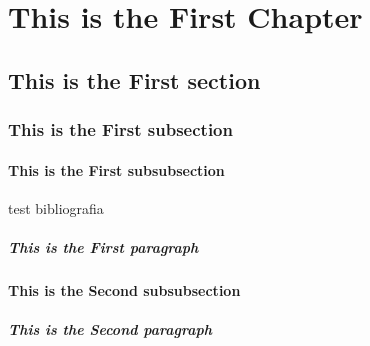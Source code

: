 \chapter{ This is the First Chapter}

\lipsum[1-2]

\section{ This is the First section}
\lipsum[2-4]

\subsection{ This is the First subsection}
\lipsum[1-2]

\subsubsection{ This is the First subsubsection}
\lipsum[1-1]
test bibliografia \cite{Yampolsky2016}

\paragraph{ This is the First paragraph}
\lipsum[1-1]


\subsubsection{ This is the Second subsubsection}
\lipsum[1-1]

\paragraph{ This is the Second paragraph}
\lipsum[1-1]




